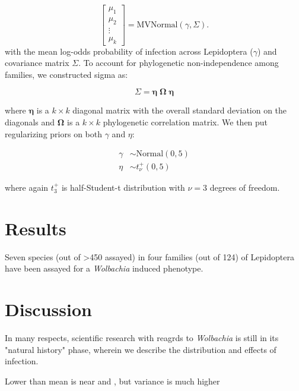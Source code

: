 \documentclass[12pt]{article}
\begin{document}
\begin{equation}
	\begin{bmatrix}
		\mu_{1} \\
        \mu_{2} \\
        \vdots \\
        \mu_{k}
	\end{bmatrix}
    = 
    \textrm{MVNormal}(\gamma, \Sigma).
\end{equation}
with the mean log-odds probability of infection across Lepidoptera ($\gamma$) and covariance matrix $\Sigma$. To account for phylogenetic non-independence among families, we constructed sigma as:

\begin{equation}
	\Sigma = \boldsymbol{\eta} \;	\boldsymbol{\Omega} \; \boldsymbol{\eta}
\end{equation}

where $\boldsymbol{\eta}$ is a $k \times k$ diagonal matrix with the overall standard deviation on the diagonals and $\boldsymbol{\Omega}$ is a $k \times k$ phylogenetic correlation matrix. We then put regularizing priors on both $\gamma$ and $\eta$:

\begin{align}
	\gamma 	&\sim \mathrm{Normal}(0, 5) \nonumber \\
	\eta   	&\sim t_{\nu}^{+}(0,5)
\end{align}

where again $t_{3}^{+}$ is half-Student-t distribution with $\nu=3$ degrees of freedom. 
\section{Results}

Seven species (out of >450 assayed) in four families (out of 124) of Lepidoptera have been assayed for a \textit{Wolbachia} induced phenotype. 
\section{Discussion}

In many respects, scientific research with reagrds to \textit{Wolbachia} is still in its "natural history" phase, wherein we describe the distribution and effects of infection.  

Lower than \citet{Hilgenboecker:2008aa}
mean is near \citet{Ahmed:2015aa} and \citet{Weinert:2015aa}, but variance is much higher
\end{document}
